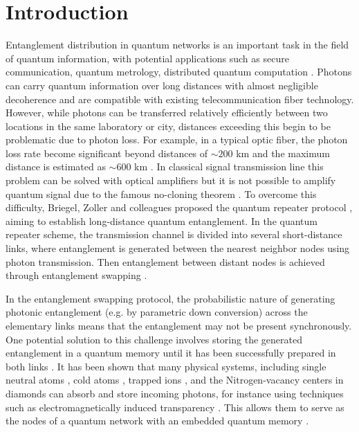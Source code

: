 \documentclass[%
  prx,%
  twocolumn,%
  preprintnumbers,%
  amsmath,%
  amssymb,%
  superscriptaddress%
]{revtex4}
\begin{document}
\maketitle


\section{Introduction}

Entanglement distribution in quantum networks is an important task in the field of quantum information, with potential applications such as secure communication, quantum metrology, distributed quantum computation \cite{Wei2022,Wehner2018,Azuma2023}. Photons can carry quantum information over long distances with almost negligible decoherence and are compatible with existing telecommunication fiber technology.
However, while photons can be transferred relatively efficiently between two locations in the same laboratory or city, distances exceeding this begin to be problematic due to photon loss.
For example, in a typical optic fiber, the photon loss rate become significant beyond distances of $ \sim 200 $ km and the maximum distance is estimated as $\sim 600$ km \cite{Pirandola2017, Yingqiu2021}.
In classical signal transmission line this problem can be solved with optical amplifiers but it is not possible to amplify quantum signal due to the famous no-cloning theorem \cite{Park1970, Wootters1982, Nielsen2010}. To overcome this difficulty, Briegel, Zoller and colleagues proposed the quantum repeater protocol \cite{Briegel1998},
aiming to establish long-distance quantum entanglement.
In the quantum repeater scheme, the transmission channel is divided into several short-distance links, where entanglement is generated between the nearest neighbor nodes using photon transmission.  Then entanglement between distant nodes is achieved through entanglement swapping \cite{bennett1993teleporting,zukowski1993event,Pan1998}.

In the entanglement swapping protocol, the probabilistic nature of generating photonic entanglement (e.g. by parametric down conversion) across the elementary links means that the entanglement may not be present synchronously.  One potential solution to this challenge involves storing the generated entanglement in a quantum memory until it has been successfully prepared in both links \cite{Lvovsky2009, Simon2010, Heshami2016}. It has been shown that many physical systems, including single neutral atoms \cite{Reiserer2015,Rosenfeld2008},
cold atoms \cite{Sangouard2011},
trapped ions \cite{Duan2010},
and the Nitrogen-vacancy centers in diamonds \cite{Childress2006, Gurudev2007,hermans2022qubit}
can absorb and store incoming photons,
for instance using techniques such as electromagnetically induced transparency \cite{Fleischhauer2005}.  This allows them to serve as the nodes of a quantum network with an embedded quantum memory \cite{Duan2001,Duan2010,Ritter2012}.
\end{document}
